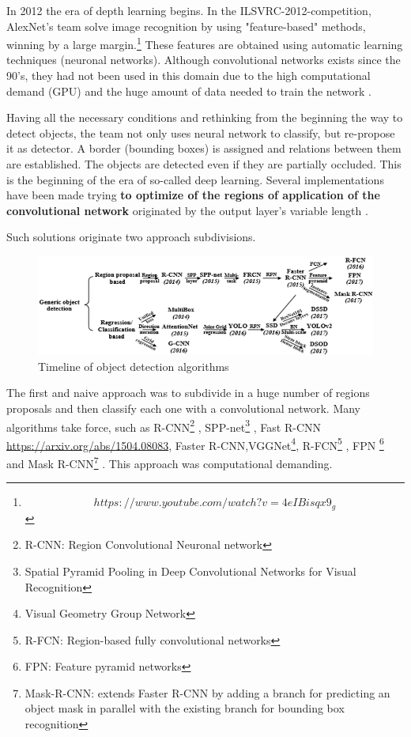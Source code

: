 \documentclass[10pt]{article}
\begin{document}
In 2012 the era of depth learning begins. In the ILSVRC-2012-competition, AlexNet's team solve image recognition by using "feature-based" methods, winning by a large margin.\footnote{$$https://www.youtube.com/watch?v=4eIBisqx9_g$$}  These features are obtained using automatic learning techniques (neuronal networks). Although convolutional networks exists since the 90's, they had not been used in this domain due to the high computational demand (GPU) and the huge amount of data needed to train the network \cite{krizhevsky2012imagenet}.

Having all the necessary conditions and rethinking from the beginning the way to detect objects, the team not only uses neural network to classify, but re-propose it as detector. A border (bounding boxes) is assigned and relations between them are established. The objects are detected even if they are partially occluded. This is the beginning of the era of so-called deep learning. Several implementations have been made trying  \textbf{ to optimize of the regions of application of the convolutional network } originated by the output layer’s variable length \cite{HistoryOfObjectDetetion}.

Such solutions originate two approach subdivisions.\\
\begin{figure}[h]
      	\centering
        \includegraphics[scale=0.9]{timeline.PNG}
        \caption{Timeline of object detection algorithms \cite{zhao2018object}}
\end{figure}

The first and naive approach was to subdivide in a huge number of regions proposals and then classify each one with a convolutional network. Many algorithms take force, such as R-CNN\footnote{R-CNN: Region Convolutional Neuronal network} \cite{girshick2014rich} , SPP-net\footnote{Spatial Pyramid Pooling in Deep Convolutional Networks for Visual Recognition} \cite{he2014spatial}, Fast R-CNN \url{https://arxiv.org/abs/1504.08083}, Faster R-CNN\cite{ren2015faster},VGGNet\footnote{Visual Geometry Group Network}, R-FCN\footnote{R-FCN: Region-based fully convolutional networks} \cite{dai2016r}, FPN \footnote{FPN: Feature pyramid networks} \cite{lin2017feature} and Mask R-CNN\footnote{Mask-R-CNN: extends Faster R-CNN by adding a branch for predicting an object mask in parallel with the existing branch for bounding box recognition} \cite{he2017mask}. This approach was computational demanding.
\end{document}
